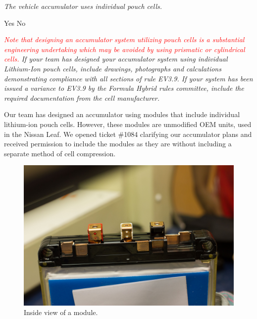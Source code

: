 \documentclass{article}
\begin{document}
    \textit{The vehicle accumulator uses individual pouch cells. } \par                      \makebox[0pt][l]{$\square$}\raisebox{.15ex}{\hspace{0.1em}} \hspace{0.2cm} Yes
    \makebox[0pt][l]{$\square$}\raisebox{.15ex}{\hspace{0.1em}$\checkmark$} \hspace{0.2cm} No

    \textit{\textcolor{red}{Note that designing an accumulator system utilizing pouch cells is a substantial engineering undertaking which may be avoided by using prismatic or cylindrical cells.} If your team has designed your accumulator system using individual Lithium-Ion pouch cells, include drawings, photographs and calculations demonstrating compliance with all sections of rule EV3.9. If your system has been issued a variance to EV3.9 by the Formula Hybrid rules committee, include the required documentation from the cell manufacturer.}

    Our team has designed an accumulator using modules that include individual lithium-ion pouch cells. However, these modules are unmodified OEM units, used in the Nissan Leaf. We opened ticket \#1084 clarifying our accumulator plans and received permission to include the modules as they are without including a separate method of cell compression.

        \begin{figure}[H]
            \centering
            \includegraphics[width = 0.7 \textwidth]{OpenModule}
            \caption{Inside view of a module. }
            \label{canopener}
        \end{figure}


\end{document}
